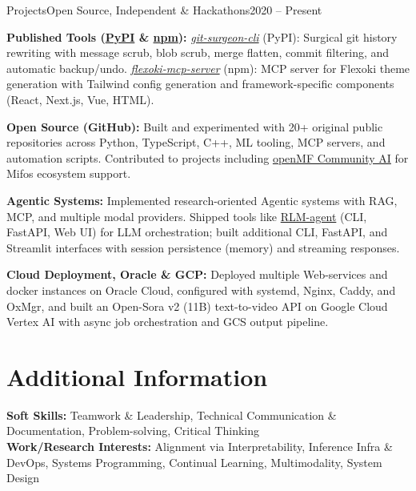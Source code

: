 \documentclass[10pt, letterpaper]{article}
\newcommand{\skill}[2]{\textbf{#1:} #2}
\begin{document}
\begin{experienceentry}{Projects}{Open Source, Independent \& Hackathons}{2020 -- Present}
    \item \textbf{Published Tools (\href{https://pypi.org/user/Raghav-56/}{PyPI} \& \href{https://www.npmjs.com/~raghav-56}{npm}):} \href{https://pypi.org/project/git-surgeon-cli/}{\textit{git-surgeon-cli}} (PyPI): Surgical git history rewriting with message scrub, blob scrub, merge flatten, commit filtering, and automatic backup/undo. \href{https://www.npmjs.com/package/@raghav-56/flexoki-mcp-server}{\textit{flexoki-mcp-server}} (npm): MCP server for Flexoki theme generation with Tailwind config generation and framework-specific components (React, Next.js, Vue, HTML).
    \item \textbf{Open Source (GitHub):} Built and experimented with 20+ original public repositories across Python, TypeScript, C++, ML tooling, MCP servers, and automation scripts. Contributed to projects including \href{https://github.com/openMF/community-ai}{openMF Community AI} for Mifos ecosystem support.
    \item \textbf{Agentic Systems:} Implemented research-oriented Agentic systems with RAG, MCP, and multiple modal providers. Shipped tools like \href{https://github.com/Raghav-56/RLM-agent}{RLM-agent} (CLI, FastAPI, Web UI) for LLM orchestration; built additional CLI, FastAPI, and Streamlit interfaces with session persistence (memory) and streaming responses.
    \item \textbf{Cloud Deployment, Oracle \& GCP:} Deployed multiple Web-services and docker instances on Oracle Cloud, configured with systemd, Nginx, Caddy, and OxMgr, and built an Open-Sora v2 (11B) text-to-video API on Google Cloud Vertex AI with async job orchestration and GCS output pipeline.
\end{experienceentry}


\section{Additional Information}
\skill{Soft Skills}{Teamwork \& Leadership, Technical Communication \& Documentation, Problem-solving, Critical Thinking}\\[0.05cm]
\skill{Work/Research Interests}{Alignment via Interpretability, Inference Infra \& DevOps, Systems Programming, Continual Learning, Multimodality, System Design}\\[0.05cm]


\end{document}
